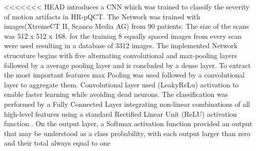\documentclass[
a4paper, 
12pt,
grayscalebody, %
abstract=on,
twoside, BCOR10mm, 12pt, DIV13,headinclude, footexclude, final, abstracton, openright
]{ibireprt}
\numberwithin{equation}{chapter}
\numberwithin{table}{chapter}
\numberwithin{figure}{chapter}
\numberwithin{algorithm}{chapter}
\numberwithin{example}{chapter}
\numberwithin{example}{chapter}
\begin{document}
<<<<<<< HEAD
\cite{Walle2023} introduces a CNN which was trained to classify the severity of motion artifacts in HR-pQCT. The Network was trained with images(XtremeCT II, Scanco Media AG) from 90 patients. The size of the scans was 512 x 512 x 168. for the training 8 equally spaced images from every scan were used resulting in a database of 3312 images.
The implemented Network strucuture begins with five alternating convolutional and max-pooling layers followed by a average pooling layer and is concluded by a dense layer. To extract the most important features max Pooling was used followed by a convolutional layer to aggregate them. Convolutional layer used (LeakyReLu) activation to enable faster learning while avoiding dead neurons.
 The classification was performed by a Fully Connected Layer integrating non-linear combinations of all high-level features using a standard Rectified Linear Unit (ReLU) activation function . On the output layer, a Softmax activation function provided an output that may be understood as a class probability, with each output larger than zero and their total always equal to one
\end{document}
